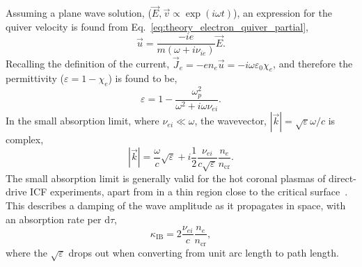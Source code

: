 Assuming a plane wave solution, ($\vec{E},\vec{v}\propto \exp{(i\omega t)}$), an expression for the quiver velocity is found from Eq.~\ref{eq:theory_electron_quiver_partial},
\begin{equation}
    \vec{u} = \frac{-ie}{m(\omega + i\nu_{ie})}\vec{E}.
\end{equation}
Recalling the definition of the current, $\vec{J}_e = -e n_e \vec{u} = -i\omega \varepsilon_0 \chi_e$, and therefore the permittivity ($\varepsilon = 1-\chi_e$) is found to be,
\begin{equation}
    \varepsilon = 1 - \frac{\omega_p^2}{\omega^2 + i \omega\nu_{ei}}.
\end{equation}
In the small absorption limit, where $\nu_{ei}\ll \omega$, the wavevector, $|\vec{k}| = \sqrt{\varepsilon}\omega/c$ is complex,
\begin{equation}
    |\vec{k}| = \frac{\omega}{c}\sqrt{\varepsilon} + i\frac{1}{2}\frac{\nu_{ei}}{c\sqrt{\varepsilon}}\frac{n_e}{n_{\text{cr}}}.
\end{equation}
The small absorption limit is generally valid for the hot coronal plasmas of direct-drive \ac{ICF} experiments, apart from in a thin region close to the critical surface~\cite{colaitis_real_2019}.
This describes a damping of the wave amplitude as it propagates in space, with an absorption rate per $\text{d}\tau$,
\begin{equation}
    \label{eq:theory_inv_brem}
    \kappa_{\text{IB}} = 2 \frac{\nu_{ei}}{c}\frac{n_e}{n_{\text{cr}}},
\end{equation}
where the $\sqrt{\varepsilon}$ drops out when converting from unit arc length to path length.

